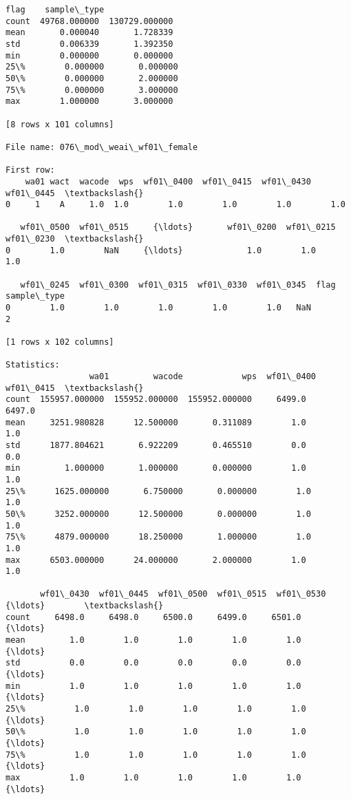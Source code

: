 \documentclass[11pt]{article}
\begin{document}
\begin{Verbatim}[commandchars=\\\{\}]
               flag    sample\_type  
count  49768.000000  130729.000000  
mean       0.000040       1.728339  
std        0.006339       1.392350  
min        0.000000       0.000000  
25\%        0.000000       0.000000  
50\%        0.000000       2.000000  
75\%        0.000000       3.000000  
max        1.000000       3.000000  

[8 rows x 101 columns]

File name: 076\_mod\_weai\_wf01\_female

First row: 
    wa01 wact  wacode  wps  wf01\_0400  wf01\_0415  wf01\_0430  wf01\_0445  \textbackslash{}
0     1    A     1.0  1.0        1.0        1.0        1.0        1.0   

   wf01\_0500  wf01\_0515     {\ldots}       wf01\_0200  wf01\_0215  wf01\_0230  \textbackslash{}
0        1.0        NaN     {\ldots}             1.0        1.0        1.0   

   wf01\_0245  wf01\_0300  wf01\_0315  wf01\_0330  wf01\_0345  flag  sample\_type  
0        1.0        1.0        1.0        1.0        1.0   NaN            2  

[1 rows x 102 columns]

Statistics: 
                 wa01         wacode            wps  wf01\_0400  wf01\_0415  \textbackslash{}
count  155957.000000  155952.000000  155952.000000     6499.0     6497.0   
mean     3251.980828      12.500000       0.311089        1.0        1.0   
std      1877.804621       6.922209       0.465510        0.0        0.0   
min         1.000000       1.000000       0.000000        1.0        1.0   
25\%      1625.000000       6.750000       0.000000        1.0        1.0   
50\%      3252.000000      12.500000       0.000000        1.0        1.0   
75\%      4879.000000      18.250000       1.000000        1.0        1.0   
max      6503.000000      24.000000       2.000000        1.0        1.0   

       wf01\_0430  wf01\_0445  wf01\_0500  wf01\_0515  wf01\_0530      {\ldots}        \textbackslash{}
count     6498.0     6498.0     6500.0     6499.0     6501.0      {\ldots}         
mean         1.0        1.0        1.0        1.0        1.0      {\ldots}         
std          0.0        0.0        0.0        0.0        0.0      {\ldots}         
min          1.0        1.0        1.0        1.0        1.0      {\ldots}         
25\%          1.0        1.0        1.0        1.0        1.0      {\ldots}         
50\%          1.0        1.0        1.0        1.0        1.0      {\ldots}         
75\%          1.0        1.0        1.0        1.0        1.0      {\ldots}         
max          1.0        1.0        1.0        1.0        1.0      {\ldots}         


\end{Verbatim}
\end{document}
